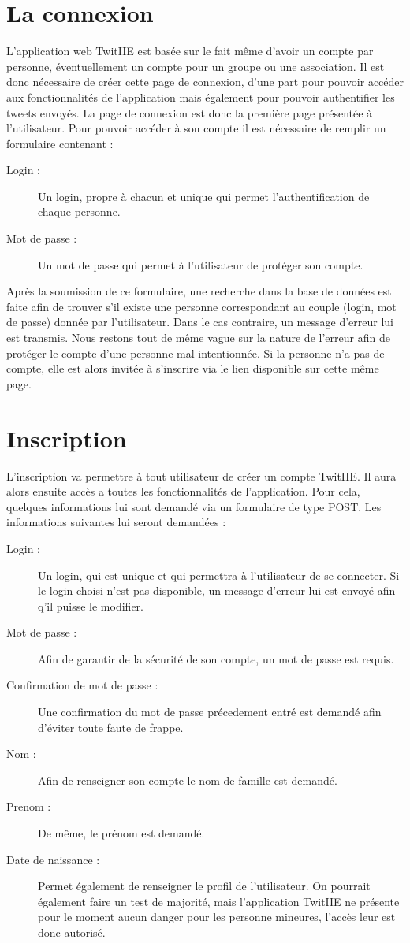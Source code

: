 \documentclass[a4paper, 12pt]{article}
\begin{document}
\newpage

\section{La connexion}	
L'application web TwitIIE est basée sur le fait même d'avoir un compte par personne, éventuellement un compte pour un groupe ou une association. Il est donc nécessaire de créer cette page de connexion, d'une part pour pouvoir accéder aux fonctionnalités de l'application mais également pour pouvoir authentifier les tweets envoyés.
La page de connexion est donc la première page présentée à l'utilisateur. Pour pouvoir accéder à son compte il est nécessaire de remplir un formulaire contenant : 
\begin{description}
\item[Login :] Un login, propre à chacun et unique qui permet l'authentification de chaque personne.
\item[Mot de passe :] Un mot de passe qui permet à l'utilisateur de protéger son compte.
\end{description}
Après la soumission de ce formulaire, une recherche dans la base de données est faite afin de trouver s'il existe une personne correspondant au couple (login, mot de passe) donnée par l'utilisateur.
Dans le cas contraire, un message d'erreur lui est transmis. Nous restons tout de même vague sur la nature de l'erreur afin de protéger le compte d'une personne mal intentionnée.
Si la personne n'a pas de compte, elle est alors invitée à s'inscrire via le lien disponible sur cette même page. 

\section{Inscription}
L'inscription va permettre à tout utilisateur de créer un compte TwitIIE. Il aura alors ensuite accès a toutes les fonctionnalités de l'application.
Pour cela, quelques informations lui sont demandé via un formulaire de type POST. Les informations suivantes lui seront demandées : 
\begin{description}
\item[Login :] Un login, qui est unique et qui permettra à l'utilisateur de se connecter. Si le login choisi n'est pas disponible, un message d'erreur lui est envoyé afin q'il puisse le modifier.
\item[Mot de passe :] Afin de garantir de la sécurité de son compte, un mot de passe est requis.
\item[Confirmation de mot de passe :] Une confirmation du mot de passe précedement entré est demandé afin d'éviter toute faute de frappe.
\item[Nom :] Afin de renseigner son compte le nom de famille est demandé.
\item[Prenom :] De même, le prénom est demandé.
\item[Date de naissance :] Permet également de renseigner le profil de l'utilisateur. On pourrait également faire un test de majorité, mais l'application TwitIIE ne présente pour le moment aucun danger pour les personne mineures, l'accès leur est donc autorisé.
\end{description}
\end{document}
